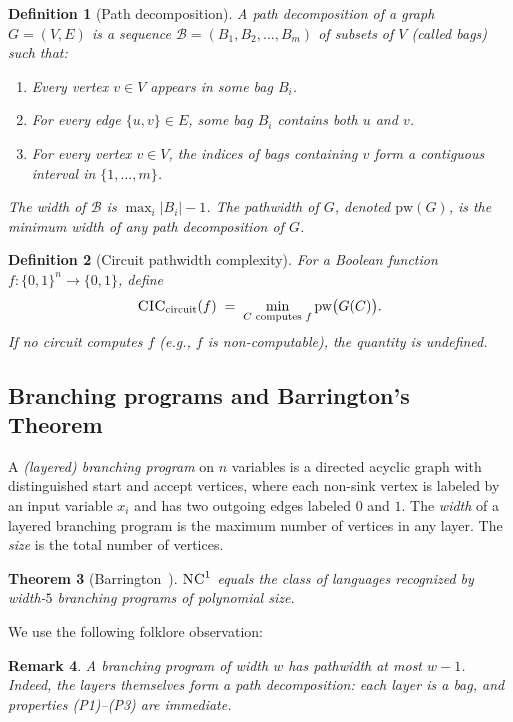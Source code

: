 \documentclass[11pt]{article}
\newtheorem{theorem}{Theorem}
\newtheorem{definition}[theorem]{Definition}
\newtheorem{remark}[theorem]{Remark}
\newcommand{\CIC}{\textsc{CIC}}
\newcommand{\pw}{\mathrm{pw}}
\newcommand{\NC}{\textsc{NC}}
\begin{document}
\begin{definition}[Path decomposition]
  A \emph{path decomposition} of a graph $G = (V, E)$ is a sequence
  $\mathcal{B} = (B_1, B_2, \dots, B_m)$ of subsets of $V$ (called \emph{bags})
  such that:
  \begin{enumerate}
    \item[(P1)] Every vertex $v \in V$ appears in some bag $B_i$.
    \item[(P2)] For every edge $\{u, v\} \in E$, some bag $B_i$ contains both
      $u$ and $v$.
    \item[(P3)] For every vertex $v \in V$, the indices of bags containing $v$
      form a contiguous interval in $\{1, \dots, m\}$.
  \end{enumerate}
  The \emph{width} of $\mathcal{B}$ is $\max_i |B_i| - 1$.  The
  \emph{pathwidth} of $G$, denoted $\pw(G)$, is the minimum width of any path
  decomposition of $G$.
\end{definition}

\begin{definition}[Circuit pathwidth complexity]
  For a Boolean function $f : \{0,1\}^n \to \{0,1\}$, define
  \[
  \CIC_{\text{circuit}}(f) \;=\; \min_{C \text{ computes } f} \pw\bigl(G(C)\bigr).
  \]
  If no circuit computes $f$ (e.g., $f$ is non-computable), the quantity is
  undefined.
\end{definition}

\subsection{Branching programs and Barrington's Theorem}

A \emph{(layered) branching program} on $n$ variables is a directed acyclic
graph with distinguished start and accept vertices, where each non-sink
vertex is labeled by an input variable $x_i$ and has two outgoing edges
labeled $0$ and $1$.  The \emph{width} of a layered branching program is the
maximum number of vertices in any layer.  The \emph{size} is the total number
of vertices.

\begin{theorem}[Barrington~\cite{Bar89}]
  \label{thm:barrington}
  $\NC^1$ equals the class of languages recognized by width-$5$ branching
  programs of polynomial size.
\end{theorem}

\noindent
We use the following folklore observation:
\begin{remark}
  \label{rem:bp-pathwidth}
  A branching program of width $w$ has pathwidth at most $w-1$.  Indeed, the
  layers themselves form a path decomposition: each layer is a bag, and
  properties (P1)--(P3) are immediate.
\end{remark}
\end{document}
